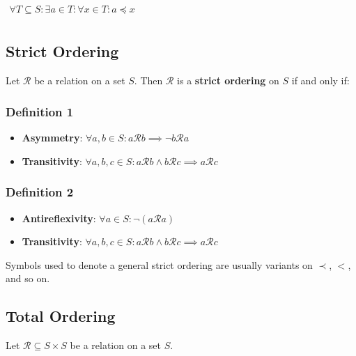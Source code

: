 \begin{math}
  \begin{array}{c}
    \\
    \forall T \subseteq S: \exists a \in T : \forall x \in T : a \preceq x
    \\
  \end{array}
\end{math}

\subsection{Strict Ordering}
\label{sec:strict-ordering}

Let $\mathcal{R}$ be a relation on a set $S$. Then $\mathcal{R}$ is a
\textbf{strict ordering} on $S$ if and only if:

\subsubsection{Definition 1}

\begin{itemize}
\item \textbf{Asymmetry}:
  $\forall a, b \in S : a \mathcal{R} b \implies \neg b \mathcal{R} a$
\item \textbf{Transitivity}:
  $\forall a, b, c \in S: a \mathcal{R} b \land b \mathcal{R} c
  \implies a \mathcal{R} c$
\end{itemize}

\subsubsection{Definition 2}

\begin{itemize}
\item \textbf{Antireflexivity}:
  $\forall a \in S: \neg (a \mathcal{R} a) $
\item \textbf{Transitivity}:
  $\forall a, b, c \in S: a \mathcal{R} b \land b \mathcal{R} c
  \implies a \mathcal{R} c$
\end{itemize}

Symbols used to denote a general strict ordering are usually variants
on $\prec$, $<$, and so on.


\subsection{Total Ordering}
\label{sec:total-ordering}

Let $\mathcal{R} \subseteq S \times S$ be a relation on a set $S$.

